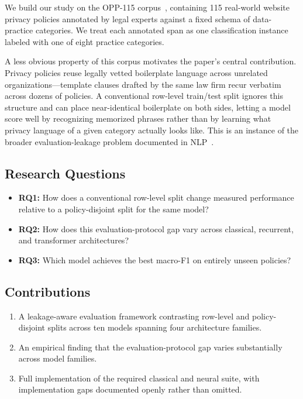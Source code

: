 \documentclass[11pt]{article}
\begin{document}
We build our study on the OPP-115 corpus~\cite{wilson-etal-2016-creation}, containing 115 real-world website privacy policies annotated by legal experts against a fixed schema of data-practice categories. We treat each annotated span as one classification instance labeled with one of eight practice categories.

A less obvious property of this corpus motivates the paper's central contribution. Privacy policies reuse legally vetted boilerplate language across unrelated organizations---template clauses drafted by the same law firm recur verbatim across dozens of policies. A conventional row-level train/test split ignores this structure and can place near-identical boilerplate on both sides, letting a model score well by recognizing memorized phrases rather than by learning what privacy language of a given category actually looks like. This is an instance of the broader evaluation-leakage problem documented in NLP~\cite{gorman-bedrick-2019-need, lewis-etal-2021-question}.

\subsection{Research Questions}

\begin{itemize}
\item \textbf{RQ1:} How does a conventional row-level split change measured performance relative to a policy-disjoint split for the same model?
\item \textbf{RQ2:} How does this evaluation-protocol gap vary across classical, recurrent, and transformer architectures?
\item \textbf{RQ3:} Which model achieves the best macro-F1 on entirely unseen policies?
\end{itemize}

\subsection{Contributions}

\begin{enumerate}
\item A leakage-aware evaluation framework contrasting row-level and policy-disjoint splits across ten models spanning four architecture families.
\item An empirical finding that the evaluation-protocol gap varies substantially across model families.
\item Full implementation of the required classical and neural suite, with implementation gaps documented openly rather than omitted.
\end{enumerate}
\end{document}
